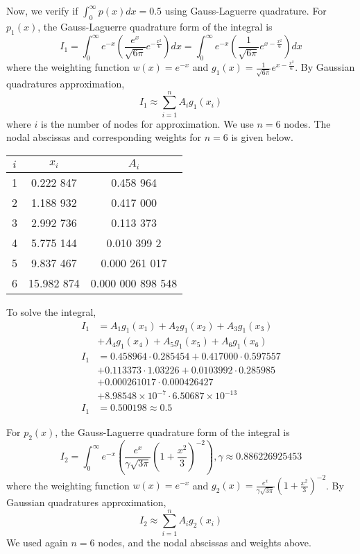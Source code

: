 \documentclass[10pt, twocolumn]{article}
\newcommand{\head}[1]{\textnormal{\textbf{#1}}}
\begin{document}
		Now, we verify if $\int_{0}^{\infty}p(x)dx = 0.5$ using Gauss-Laguerre quadrature.
		For $p_1(x)$, the Gauss-Laguerre quadrature form of the integral is
		$$I_1 = \int_{0}^{\infty}e^{-x}\left(\frac{e^{x}}{\sqrt{6\pi}}e^{-\frac{x^2}{6}}\right)dx=
			\int_{0}^{\infty}e^{-x}\left(\frac{1}{\sqrt{6\pi}}e^{x-\frac{x^2}{6}}\right)dx
		$$
		where the weighting function $w(x)=e^{-x}$ and $g_1(x)=\frac{1}{\sqrt{6\pi}}e^{x-\frac{x^2}{6}}$. By Gaussian quadratures approximation,
		$$I_1 \approx \sum_{i=1}^{n}A_ig_1(x_i)
		$$
		where $i$ is the number of nodes for approximation. We use $n=6$ nodes. The nodal abscissas and corresponding weights for $n=6$ is given below.
		\begin{center}
		\begin{tabular}{ccc}
			\hline
			\head{$i$} & \head{$x_i$} & \head{$A_i$}\\
			\hline
			1 & 0.222 847 & 0.458 964 \\
			2 & 1.188 932 & 0.417 000 \\
			3 & 2.992 736 & 0.113 373 \\
			4 & 5.775 144 & 0.010 399 2 \\
			5 & 9.837 467 & 0.000 261 017 \\
			6 & 15.982 874 & 0.000 000 898 548 \\
			\hline
		\end{tabular}
		\end{center}
		To solve the integral,
		$$\begin{aligned}
			I_1 &= A_1g_1(x_1) + A_2g_1(x_2) + A_3g_1(x_3)\\
				&+ A_4g_1(x_4) + A_5g_1(x_5) + A_6g_1(x_6)\\
			I_1 &= 0.458964\cdot0.285454 + 0.417000\cdot0.597557\\
				&+ 0.113373\cdot1.03226 + 0.0103992\cdot0.285985\\
				&+ 0.000261017\cdot0.000426427\\
				&+ 8.98548\times10^{-7}\cdot6.50687\times10^{-13}\\
			I_1 &= 0.500198 \approx 0.5
		\end{aligned}$$
		
		For $p_2(x)$, the Gauss-Laguerre quadrature form of the integral is
		$$I_2=\int_{0}^{\infty}e^{-x}\left(\frac{e^x}{\gamma\sqrt{3\pi}}\left(1+\frac{x^2}{3}\right)^{-2}\right), \gamma\approx0.886226925453$$
		where the weighting function $w(x)=e^{-x}$ and $g_2(x)=\frac{e^x}{\gamma\sqrt{3\pi}}\left(1+\frac{x^2}{3}\right)^{-2}$. By Gaussian quadratures approximation,
		$$I_2 \approx \sum_{i=1}^{n}A_ig_2(x_i)$$
		We used again $n=6$ nodes, and the nodal abscissas and weights above.
		
\end{document}

